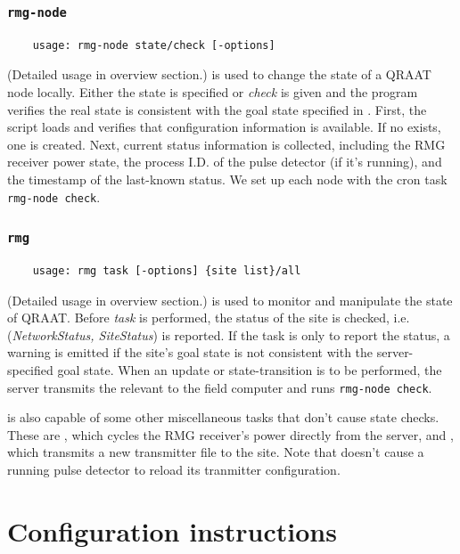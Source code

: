 \documentclass[letter]{article}
\begin{document}
\subsubsection{\texttt{rmg-node}}
\begin{verbatim}
    usage: rmg-node state/check [-options]
\end{verbatim}
(Detailed usage in overview section.)  is used to change the state 
of a QRAAT node locally. Either the state is specified or \textit{check} is given and the
program verifies the real state is consistent with the goal state specified in 
. First, the script loads  and 
verifies that configuration information is available. If no  exists, 
one is created. Next, current status information is collected, including the RMG 
receiver power state, the process I.D. of the pulse detector (if it's running), and
the timestamp of the last-known status. We set up each node with the cron task 
\texttt{rmg-node check}.

\subsubsection{\texttt{rmg}}
\begin{verbatim}
    usage: rmg task [-options] {site list}/all 
\end{verbatim}
(Detailed usage in overview section.)  is used to monitor and manipulate the 
state of QRAAT. Before \textit{task} is performed, the status of the site is checked, 
i.e. (\textit{NetworkStatus, SiteStatus}) is reported. If the task is only to report 
the status, a warning is emitted if the site's goal state is not consistent with the
server-specified goal state. When an update or state-transition is to be performed, 
the server transmits the relevant  to the field computer and runs 
\texttt{rmg-node check}. 

 is also capable of some other miscellaneous tasks that don't cause state 
checks. These are , which cycles the RMG receiver's power directly 
from the server, and , which transmits a new transmitter file to 
the site. Note that  doesn't cause a running pulse detector to reload its 
tranmitter configuration. 


\section{Configuration instructions}
\end{document}
